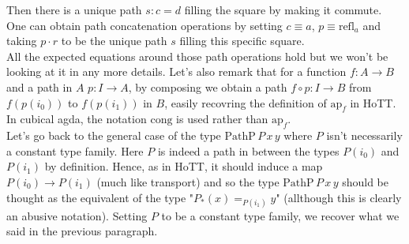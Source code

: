 \documentclass{report}
\begin{document}
\begin{center}
\end{center}
Then there is a unique path $s : c = d$ filling the square by making it commute. One can obtain path concatenation operations by setting $c \equiv a$, $p \equiv \mathrm{refl}_a$ and taking $p \cdot r$ to be the unique path $s$ filling this specific square.\\
All the expected equations around those path operations hold but we won't be looking at it in any more details. Let's also remark that for a function $f : A \rightarrow B$ and a path in $A$ $p: I \rightarrow A$, by composing we obtain a path $f \circ p : I \rightarrow B$ from $f(p(i_0))$ to $f(p(i_1))$ in $B$, easily recovring the definition of $\mathrm{ap}_f$ in HoTT. In cubical agda, the notation $\mathrm{cong}$ is used rather than $\mathrm{ap}_f$. \\
Let's go back to the general case of the type $\mathrm{PathP} \hspace{2pt} P \hspace{2pt} x \hspace{2pt} y$ where $P$ isn't necessarily a constant type family. Here $P$ is indeed a path in between the types $P(i_0)$ and $P(i_1)$ by definition. Hence, as in HoTT, it should induce a map $P(i_0) \rightarrow P(i_1)$ (much like transport) and so the type $\mathrm{PathP} \hspace{2pt} P \hspace{2pt} x \hspace{2pt} y$ should be thought as the equivalent of the type "$P_*(x)=_{P(i_1)} y$" (allthough this is clearly an abusive notation). Setting $P$ to be a constant type family, we recover what we said in the previous paragraph.
\end{document}

